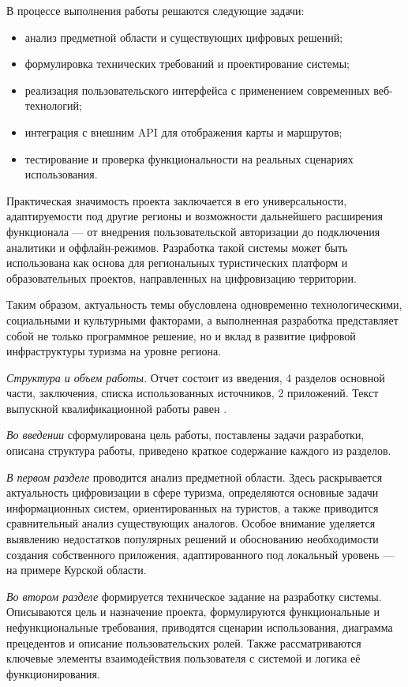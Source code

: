 В процессе выполнения работы решаются следующие задачи:
\begin{itemize}
\item анализ предметной области и существующих цифровых решений;
\item формулировка технических требований и проектирование системы;
\item реализация пользовательского интерфейса с применением современных веб-технологий;
\item интеграция с внешним API для отображения карты и маршрутов;
\item тестирование и проверка функциональности на реальных сценариях использования.
\end{itemize}

Практическая значимость проекта заключается в его универсальности, адаптируемости под другие регионы и возможности дальнейшего расширения функционала — от внедрения пользовательской авторизации до подключения аналитики и оффлайн-режимов. Разработка такой системы может быть использована как основа для региональных туристических платформ и образовательных проектов, направленных на цифровизацию территории.

Таким образом, актуальность темы обусловлена одновременно технологическими, социальными и культурными факторами, а выполненная разработка представляет собой не только программное решение, но и вклад в развитие цифровой инфраструктуры туризма на уровне региона.

\emph{Структура и объем работы.} Отчет состоит из введения, 4 разделов основной части, заключения, списка использованных источников, 2 приложений. Текст выпускной квалификационной работы равен .

\emph{Во введении} сформулирована цель работы, поставлены задачи разработки, описана структура работы, приведено краткое содержание каждого из разделов.

\emph{В первом разделе} проводится анализ предметной области. Здесь раскрывается актуальность цифровизации в сфере туризма, определяются основные задачи информационных систем, ориентированных на туристов, а также приводится сравнительный анализ существующих аналогов. Особое внимание уделяется выявлению недостатков популярных решений и обоснованию необходимости создания собственного приложения, адаптированного под локальный уровень — на примере Курской области.

\emph{Во втором разделе} формируется техническое задание на разработку системы. Описываются цель и назначение проекта, формулируются функциональные и нефункциональные требования, приводятся сценарии использования, диаграмма прецедентов и описание пользовательских ролей. Также рассматриваются ключевые элементы взаимодействия пользователя с системой и логика её функционирования.

